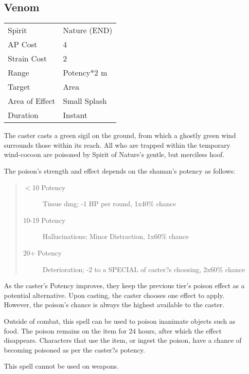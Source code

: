\documentclass[11pt,a4paper,twocolumn]{book}
\begin{document}
\subsection*{Venom}
{
	\begin{tabu} to 70mm{| X[l,4] | X[l,7] |}
		\hline
		Spirit         & Nature (END) \\
		AP Cost        & 4            \\
		Strain Cost    & 2            \\
		Range          & Potency*2 m  \\
		Target         & Area         \\
		Area of Effect & Small Splash \\
		Duration       & Instant      \\ \hline
	\end{tabu}
}

The caster casts a green sigil on the ground, from which a ghostly green wind surrounds those within its reach. All who are trapped within the temporary wind-cocoon are poisoned by Spirit of Nature's gentle, but merciless hoof.

The poison's strength and effect depends on the shaman's potency as follows:
\begin{quote}
	\begin{description}
		\item[$<$10 Potency] 	Tissue dmg; -1 HP per round, 1x40\% chance
		\item[10-19 Potency] 	Hallucinations; Minor Distraction, 1x60\% chance
		\item[20+ Potency] 		Deterioration; -2 to a SPECIAL of caster?s choosing, 2x60\% chance
	\end{description}	
\end{quote}

As the caster's Potency improves, they keep the previous tier's poison effect as a potential alternative. Upon casting, the caster chooses one effect to apply. However, the poison's chance is always the highest available to the caster.

Outside of combat, this spell can be used to poison inanimate objects such as food. The poison remains on the item for 24 hours, after which the effect disappears. Characters that use the item, or ingest the poison, have a chance of becoming poisoned as per the caster?s potency.

This spell cannot be used on weapons.
\end{document}
